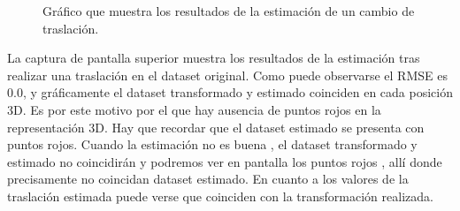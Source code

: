 \begin{figure}
\begin{center}
\hspace{0.5cm}

\end{center}

\caption{Gráfico que muestra los resultados de la estimación de un cambio de traslación.}
\end{figure}

La captura de pantalla superior muestra los resultados de la estimación tras realizar una traslación en el dataset original. Como puede observarse el RMSE es 0.0, y gráficamente el dataset transformado y estimado coinciden en cada posición 3D.  Es por este motivo por el que hay ausencia de puntos rojos en la representación 3D. Hay que recordar que el dataset estimado se presenta con puntos rojos. Cuando la estimación no es buena , el dataset transformado y estimado no coincidirán y podremos ver en pantalla los puntos rojos , allí donde precisamente no coincidan dataset estimado. En cuanto a los valores de la traslación estimada puede verse que coinciden con la transformación realizada.


